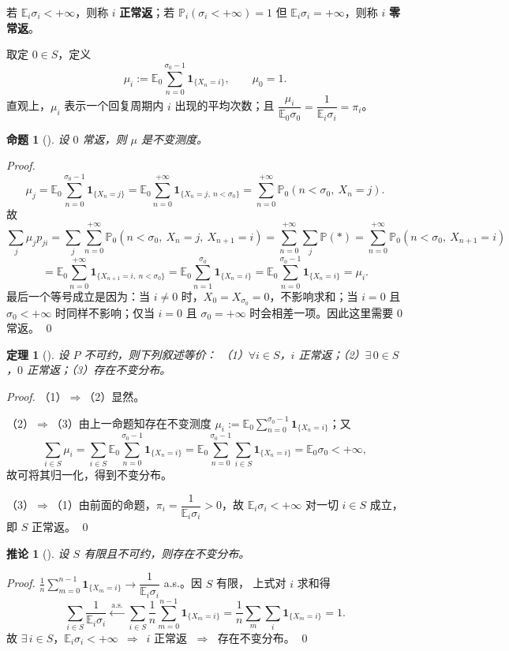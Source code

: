 \documentclass[lang=cn,10pt,newtx,thmcnt=chapter,mode=simple]{vividbook}
\providecommand{\E}{}\renewcommand{\E}{\mathbb{E}}
\providecommand{\Pp}{}\renewcommand{\Pp}{\mathbb{P}}
\newcommand{\ind}[1]{\mathbf{1}_{\{#1\}}}
\newcommand{\darr}{\;\Rightarrow\;}
\theoremstyle{vividthm}
\newtheorem*{vividtheorem}{定理}
\newtheorem*{vividproposition}{命题}
\newtheorem*{vividcorollary}{推论}
\theoremstyle{vividdef}
\theoremstyle{vividexa}
\theoremstyle{vividrem}
\renewenvironment{theorem}[1][]{\begin{vividtheorem}[#1]}{\end{vividtheorem}}
\renewenvironment{proposition}[1][]{\begin{vividproposition}[#1]}{\end{vividproposition}}
\renewenvironment{corollary}[1][]{\begin{vividcorollary}[#1]}{\end{vividcorollary}}
\begin{document}
若 $\E_i\sigma_i<+\infty$，则称 $i$ \textbf{正常返}；若 $\Pp_i(\sigma_i<+\infty)=1$ 但
$\E_i\sigma_i=+\infty$，则称 $i$ \textbf{零常返}。

取定 $0\in S$，定义
\[
\mu_i:=\E_0\sum_{n=0}^{\sigma_0-1}\ind{X_n=i},
\qquad \mu_0=1 .
\]
直观上，$\mu_i$ 表示一个回复周期内 $i$ 出现的平均次数；且
$\dfrac{\mu_i}{\E_0\sigma_0}=\dfrac{1}{\E_i\sigma_i}=\pi_i$。

\begin{proposition}
设 $0$ 常返，则 $\mu$ 是不变测度。
\end{proposition}

\begin{proof}
\[
\mu_j=\E_0\sum_{n=0}^{\sigma_0-1}\ind{X_n=j}
=\E_0\sum_{n=0}^{+\infty}\ind{X_n=j,\ n<\sigma_0}
=\sum_{n=0}^{+\infty}\Pp_0(n<\sigma_0,\ X_n=j).
\]
故
\[
\sum_j\mu_jp_{ji}
=\sum_j\sum_{n=0}^{+\infty}\Pp_0(n<\sigma_0,\ X_n=j,\ X_{n+1}=i)
=\sum_{n=0}^{+\infty}\sum_j\Pp(\ast)
=\sum_{n=0}^{+\infty}\Pp_0(n<\sigma_0,\ X_{n+1}=i)
\]
\[
=\E_0\sum_{n=0}^{+\infty}\ind{X_{n+1}=i,\ n<\sigma_0}
=\E_0\sum_{n=1}^{\sigma_0}\ind{X_n=i}
=\E_0\sum_{n=0}^{\sigma_0-1}\ind{X_n=i}=\mu_i .
\]
最后一个等号成立是因为：当 $i\ne0$ 时，$X_0=X_{\sigma_0}=0$，不影响求和；当 $i=0$ 且
$\sigma_0<+\infty$ 时同样不影响；仅当 $i=0$ 且 $\sigma_0=+\infty$ 时会相差一项。因此这里需要
$0$ 常返。 \qed
\end{proof}

\begin{theorem}
设 $P$ 不可约，则下列叙述等价：
（1）$\forall i\in S$，$i$ 正常返；（2）$\exists\,0\in S$，$0$ 正常返；（3）存在不变分布。
\end{theorem}

\begin{proof}
（1）$\Rightarrow$（2）显然。

（2）$\Rightarrow$（3）由上一命题知存在不变测度
$\mu_i:=\E_0\sum_{n=0}^{\sigma_0-1}\ind{X_n=i}$；又
\[
\sum_{i\in S}\mu_i=\sum_{i\in S}\E_0\sum_{n=0}^{\sigma_0-1}\ind{X_n=i}
=\E_0\sum_{n=0}^{\sigma_0-1}\sum_{i\in S}\ind{X_n=i}
=\E_0\sigma_0<+\infty,
\]
故可将其归一化，得到不变分布。

（3）$\Rightarrow$（1）由前面的命题，$\pi_i=\dfrac{1}{\E_i\sigma_i}>0$，故
$\E_i\sigma_i<+\infty$ 对一切 $i\in S$ 成立，即 $S$ 正常返。 \qed
\end{proof}

\begin{corollary}
设 $S$ 有限且不可约，则存在不变分布。
\end{corollary}

\begin{proof}
$\frac1n\sum_{m=0}^{n-1}\ind{X_m=i}\to\dfrac{1}{\E_i\sigma_i}$ a.s.。因 $S$ 有限，
上式对 $i$ 求和得
\[
\sum_{i\in S}\frac{1}{\E_i\sigma_i}
\xleftarrow{\ \text{a.s.}\ }
\sum_{i\in S}\frac1n\sum_{m=0}^{n-1}\ind{X_m=i}
=\frac1n\sum_m\sum_i\ind{X_m=i}=1 .
\]
故 $\exists\,i\in S$，$\E_i\sigma_i<+\infty\ \darr\ i$ 正常返 $\darr$ 存在不变分布。 \qed
\end{proof}
\end{document}
